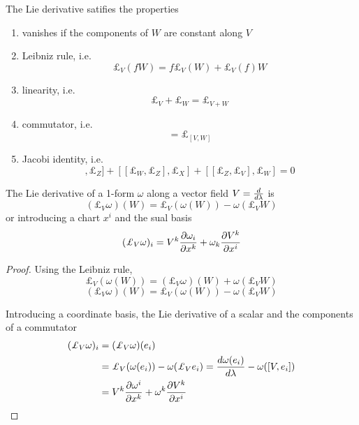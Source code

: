     The Lie derivative satifies the properties 
    \begin{enumerate}
        \item vanishes if the components of $W$ are constant along $V$
        \item Leibniz rule, i.e. 
            \begin{equation*}
                \pounds_V (fW) = f \pounds_V (W) + \pounds_V (f) W  
            \end{equation*}
        \item linearity, i.e.
            \begin{equation*}
                \pounds_V + \pounds_W = \pounds_{V+W}
            \end{equation*}
        \item commutator, i.e.
            \begin{equation*}
                [\pounds_V, \pounds_W] = \pounds_{[V,W]}
            \end{equation*}
        \item Jacobi identity, i.e.
            \begin{equation*}
                [[\pounds_V, \pounds_W], \pounds_Z] + [[\pounds_W, \pounds_Z], \pounds_X] + [[\pounds_Z, \pounds_V], \pounds_W] = 0 
            \end{equation*}
    \end{enumerate}

    The Lie derivative of a 1-form $\omega$ along a vector field $V=\frac{d}{d\lambda}$ is 
    \begin{equation*}
        (\pounds_V \omega ) (W) = \pounds_V (\omega(W)) - \omega(\pounds_V W)
    \end{equation*}
    or introducing a chart $x^i$ and the sual basis
    \begin{equation*}
        (\pounds_V \omega)_i = V^k \pdv{\omega_i}{x^k} + \omega_k \pdv{V^k}{x^i}
    \end{equation*}

    \begin{proof}
        Using the Leibniz rule,
        \begin{equation*}
            \pounds_V (\omega (W)) = (\pounds_V \omega) (W) + \omega  (\pounds_V W)
        \end{equation*}
        \begin{equation*}
             (\pounds_V \omega) (W) = \pounds_V (\omega (W)) - \omega  (\pounds_V W)
        \end{equation*}

        Introducing a coordinate basis, the Lie derivative of a scalar and the components of a commutator
        \begin{equation*}
        \begin{aligned}
            (\pounds_V \omega)_i & = (\pounds_V \omega )(e_i) \\ & = \pounds_V (\omega (e_i)) - \omega  (\pounds_V e_i) = \dv{\omega (e_i)}{\lambda} - \omega ([V, e_i]) \\ & = V^k \pdv{\omega^i}{x^k} + \omega^k \pdv{V^k}{x^i}
        \end{aligned}
        \end{equation*}
    \end{proof}

